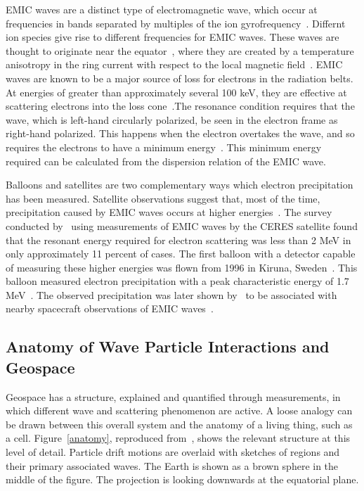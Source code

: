 EMIC waves are a distinct type of electromagnetic wave, which occur at frequencies in bands separated by multiples of the ion gyrofrequency~\citep{thorne2010}. Differnt ion species give rise to different frequencies for EMIC waves. These waves are thought to originate near the equator~\citep{fraser1996,lotouaniu2005,millan2007}, where they are created by a temperature anisotropy in the ring current with respect to the local magnetic field~\citep{jordanova2001}. EMIC waves are known to be a major source of loss for electrons in the radiation belts. At energies of greater than approximately several 100 keV, they are effective at scattering electrons into the loss cone~\citet{thorne1981,millan2007}.The resonance condition requires that the wave, which is left-hand circularly polarized, be seen in the electron frame as right-hand polarized. This happens when the electron overtakes the wave, and so requires the electrons to have a  minimum energy~\citet{millan2007}. This minimum energy required can be calculated from the dispersion relation of the EMIC wave.

Balloons and satellites are two complementary ways which electron precipitation has been measured. Satellite observations suggest that, most of the time, precipitation caused by EMIC waves occurs at higher energies~\citep{millan2007}. The survey conducted by~\citep{merideth2003} using measurements of EMIC waves by the CERES satellite found that the resonant energy required for electron scattering was less than 2 MeV in only approximately 11 percent of cases. The first balloon with a detector capable of measuring these higher energies was flown from 1996 in Kiruna, Sweden~\citep{millan2007}. This balloon measured electron precipitation with a peak characteristic energy of 1.7 MeV~\citep{foat1998}. The observed precipitation was later shown by~\citep{lorentzen2000} to be associated with nearby spacecraft observations of EMIC waves~\citet{millan2007}.


\subsection{Anatomy of Wave Particle Interactions and Geospace}

Geospace has a structure, explained and quantified through measurements, in which different wave and scattering phenomenon are active. A loose analogy can be drawn between this overall system and the anatomy of a living thing, such as a cell. Figure~\ref{anatomy}, reproduced from~\citet{thorne2010}, shows the relevant structure at this level of detail. Particle drift motions are overlaid with sketches of regions and their primary associated waves. The Earth is shown as a brown sphere in the middle of the figure. The projection is looking downwards at the equatorial plane. 

